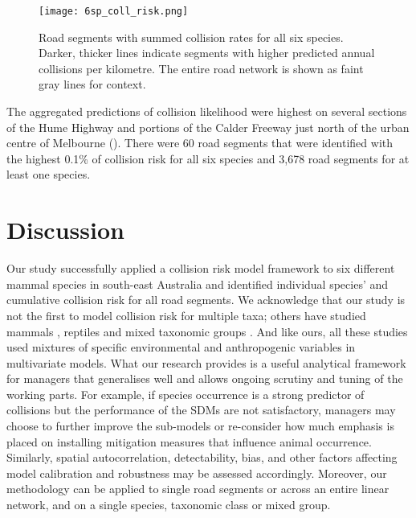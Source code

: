 \begin{figure*}[!t]
  \centering
  \texttt{[image: 6sp\_coll\_risk.png]}
  \caption[Road segments with predictions of high collision likelihood for six mammal species]{Road segments with summed collision rates for all six species. Darker, thicker lines indicate segments with higher predicted annual collisions per kilometre. The entire road network is shown as faint gray lines for context.}
  \label{6sp_collrisk}
\end{figure*}

The aggregated predictions of collision likelihood were highest on several sections of the Hume Highway and portions of the Calder Freeway just north of the urban centre of Melbourne (). There were 60 road segments that were identified with the highest 0.1\% of collision risk for all six species and 3,678 road segments for at least one species.

\section{Discussion}

Our study successfully applied a collision risk model framework to six different mammal species in south-east Australia and identified individual species' and cumulative collision risk for all road segments. We acknowledge that our study is not the first to model collision risk for multiple taxa; others have studied mammals \citep[e.g.][]{clev02,cser13,jaar06}, reptiles \citep[e.g.][]{guns12,lang12} and mixed taxonomic groups \citep[e.g.][]{clev02,garr15,lang09,litv08}.  And like ours, all these studies used mixtures of specific environmental and anthropogenic variables in multivariate models. What our research provides is a useful analytical framework for managers that generalises well and allows ongoing scrutiny and tuning of the working parts.  For example, if species occurrence is a strong predictor of collisions but the performance of the SDMs are not satisfactory, managers may choose to further improve the sub-models or re-consider how much emphasis is placed on installing mitigation measures that influence animal occurrence.  Similarly, spatial autocorrelation, detectability, bias, and other factors affecting model calibration and robustness may be assessed accordingly. Moreover, our methodology can be applied to single road segments or across an entire linear network, and on a single species, taxonomic class or mixed group.

